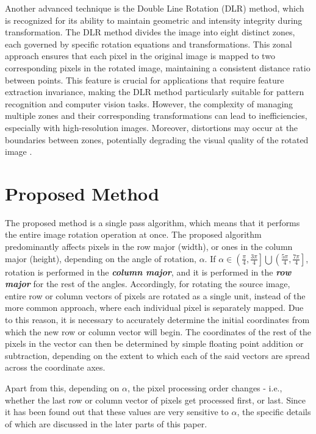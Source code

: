 \documentclass[conference]{IEEEtran}
\begin{document}
Another advanced technique is the Double Line Rotation (DLR) method, which is recognized for its ability to maintain geometric and intensity integrity during transformation. The DLR method divides the image into eight distinct zones, each governed by specific rotation equations and transformations. This zonal approach ensures that each pixel in the original image is mapped to two corresponding pixels in the rotated image, maintaining a consistent distance ratio between points. This feature is crucial for applications that require feature extraction invariance, making the DLR method particularly suitable for pattern recognition and computer vision tasks. However, the complexity of managing multiple zones and their corresponding transformations can lead to inefficiencies, especially with high-resolution images. Moreover, distortions may occur at the boundaries between zones, potentially degrading the visual quality of the rotated image \cite{ashtari2015double}.



\section{Proposed Method}
The proposed method is a single pass algorithm, which means that it performs the entire image rotation operation at once. The proposed algorithm predominantly affects pixels in the row major (width), or ones in the column major (height), depending on the angle of rotation, $\alpha$.
If $\alpha \in \left ( \frac{\pi}{4}, \frac{3 \pi}{4} \right ] \bigcup \left ( \frac{5 \pi}{4}, \frac{7 \pi}{4} \right ]$, rotation is performed in the \textit{\textbf{column major}}, and it is performed in the \textit{\textbf{row major}} for the rest of the angles. Accordingly, for rotating the source image, entire row or column vectors of pixels are rotated as a single unit, instead of the more common approach, where each individual pixel is separately mapped. Due to this reason, it is necessary to accurately determine the initial coordinates from which the new row or column vector will begin. The coordinates of the rest of the pixels in the vector can then be determined by simple floating point addition or subtraction, depending on the extent to which each of the said vectors are spread across the coordinate axes.

Apart from this, depending on $\alpha$, the pixel processing order changes - i.e., whether the last row or column vector of pixels get processed first, or last. Since it has been found out that these values are very sensitive to $\alpha$, the specific details of which are discussed in the later parts of this paper.
\end{document}
